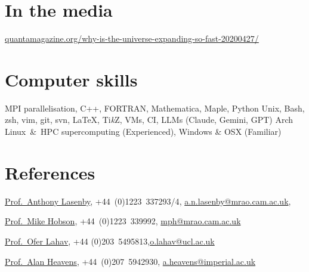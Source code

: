 \documentclass[11pt,a4paper,sans]{moderncv}
\begin{document}
\section{In the media}
{\href{https://www.quantamagazine.org/why-is-the-universe-expanding-so-fast-20200427/}{quantamagazine.org/why-is-the-universe-expanding-so-fast-20200427/}}

\section{Computer skills}
 {MPI parallelisation, C++, FORTRAN, Mathematica, Maple, Python}
   {Unix, Bash, zsh, vim, git, svn, \LaTeX, Ti\textit{k}Z, VMs, CI, LLMs (Claude, Gemini, GPT)}
          {Arch Linux~\&~HPC supercomputing (Experienced), Windows \& OSX (Familiar)}


\section{References}
\href{https://www.kicc.cam.ac.uk/directory/anl1000}{Prof.\ Anthony Lasenby}, {+44~(0)1223~337293/4}, \href{mailto:a.n.lasenby@mrao.cam.ac.uk}{a.n.lasenby@mrao.cam.ac.uk}, 

\href{https://www.phy.cam.ac.uk/directory/hobsonm}{Prof.\ Mike Hobson}, {+44~(0)1223~339992}, \href{mailto:mph@mrao.cam.ac.uk}{mph@mrao.cam.ac.uk} 


\href{https://www.ucl.ac.uk/astrophysics/professor-ofer-lahav}{Prof.\ Ofer Lahav}, {+44 (0)203~5495813},\href{mailto:o.lahav@ucl.ac.uk}{o.lahav@ucl.ac.uk} 

\href{https://www.imperial.ac.uk/people/a.heavens}{Prof.\ Alan Heavens}, {+44~(0)207~5942930}, \href{mailto:a.heavens@imperial.ac.uk}{a.heavens@imperial.ac.uk} 
\end{document}
